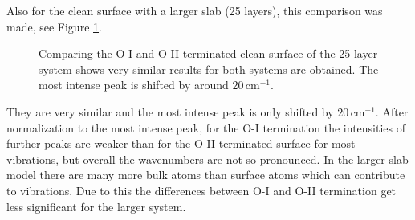 \documentclass[11pt,DIV=13,BCOR=5mm,a4paper,headinclude]{scrbook}
\begin{document}
Also for the clean surface with a larger slab (25 layers), this comparison was made, see Figure \ref{abb:comp_O-I-O-II_25}.
\begin{figure}[!h]
 \centering
 \caption{Comparing the O-I and O-II terminated clean surface of the 25 layer system shows very similar results for both systems are obtained.
The most intense peak is shifted by around $20\,$cm$^{-1}$.}
 \label{abb:comp_O-I-O-II_25}
\end{figure}
They are very similar and the most intense peak is only shifted by $20\,$cm$^{-1}$.
After normalization to the most intense peak, for the O-I termination the intensities of further peaks are weaker than for the O-II terminated surface for most vibrations, but overall the wavenumbers are not so pronounced.
In the larger slab model there are many more bulk atoms than surface atoms which can contribute to vibrations.
Due to this the differences between O-I and O-II termination get less significant for the larger system.


\renewcommand{\cleardoublepage}{}
~
\clearpage
~
\clearpage
{}
\end{document}
